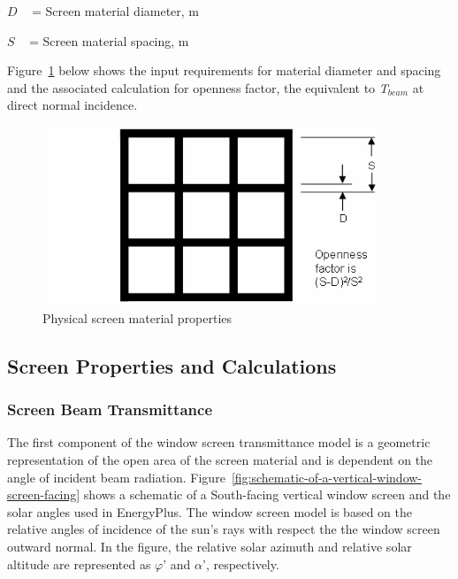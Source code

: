 \(D\) ~ = Screen material diameter, m

\(S\) ~ = Screen material spacing, m

Figure~\ref{fig:physical-screen-material-properties} below shows the input requirements for material diameter and spacing and the associated calculation for openness factor, the equivalent to \emph{T\(_{beam}\)} at direct normal incidence.

\begin{figure}[hbtp] %
\centering
\includegraphics[width=0.9\textwidth, height=0.9\textheight, keepaspectratio=true]{media/image1153.png}
\caption{Physical screen material properties \protect \label{fig:physical-screen-material-properties}}
\end{figure}

\subsection{Screen Properties and Calculations}\label{screen-properties-and-calculations}

\subsubsection{Screen Beam Transmittance}\label{screen-beam-transmittance}

The first component of the window screen transmittance model is a geometric representation of the open area of the screen material and is dependent on the angle of incident beam radiation. Figure~\ref{fig:schematic-of-a-vertical-window-screen-facing} shows a schematic of a South-facing vertical window screen and the solar angles used in EnergyPlus. The window screen model is based on the relative angles of incidence of the sun's rays with respect the the window screen outward normal. In the figure, the relative solar azimuth and relative solar altitude are represented as \(\varphi\)' and \(\alpha\)', respectively.

